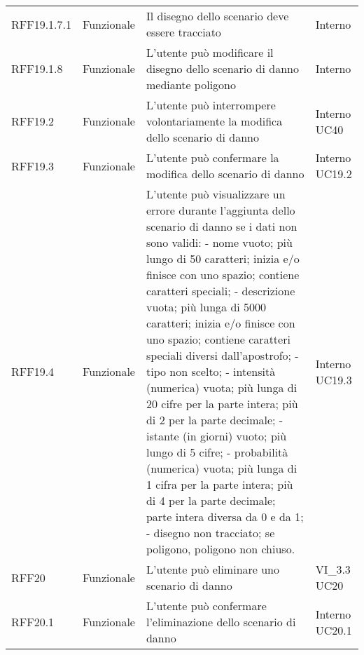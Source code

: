 \begin{longtable}{p{2cm}!{\VRule[1pt]}p{2cm}!{\VRule[1pt]}p{5cm}!{\VRule[1pt]}p{1.5cm}}
	RFF19.1.7.1                      & Funzionale\newline               & Il disegno dello scenario deve essere tracciato                                                                           & Interno                      \\
	RFF19.1.8                        & Funzionale\newline               & L'utente può modificare il disegno dello scenario di danno mediante poligono                                             & Interno                      \\
	RFF19.2                          & Funzionale\newline               & L'utente può interrompere volontariamente la modifica dello scenario di danno                                            & Interno \newline UC40        
	\\
	RFF19.3                          & Funzionale\newline               & L'utente può confermare la modifica dello scenario di danno                                                              & Interno \newline UC19.2      
	\\
	RFF19.4&Funzionale\newline  & L'utente può visualizzare un errore durante l'aggiunta dello scenario di danno se i dati non sono validi:
	- nome vuoto; più lungo di 50 caratteri; inizia e/o
	finisce con uno spazio; contiene caratteri speciali;
	- descrizione vuota; più lunga di 5000 caratteri;
	inizia e/o finisce con uno spazio; contiene
	caratteri speciali diversi dall'apostrofo;
	- tipo non scelto;
	- intensità (numerica) vuota; più lunga di 20 cifre per la
	parte intera; più di 2 per la parte decimale;
	- istante (in giorni) vuoto; più lungo di 5 cifre;
	- probabilità (numerica) vuota; più lunga di 1 cifra per la
	parte intera; più di 4 per la parte decimale; parte
	intera diversa da 0 e da 1;
	- disegno non tracciato; se poligono, poligono non
	chiuso. & Interno \newline UC19.3
	\\
		RFF20                            & Funzionale\newline               & L'utente può eliminare uno scenario di danno                                                                             & VI_3.3 \newline UC20         
	\\
	RFF20.1                          & Funzionale\newline               & L'utente può confermare l'eliminazione dello scenario di danno                                                           & Interno \newline UC20.1      

\end{longtable}
